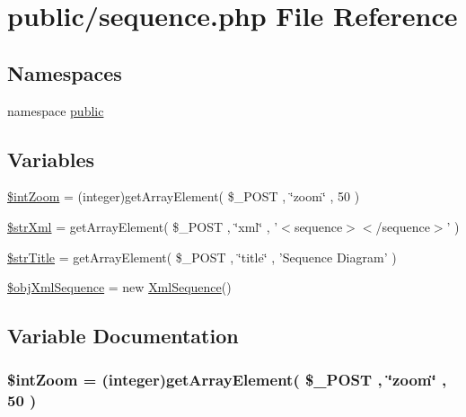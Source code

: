 \hypertarget{sequence_8php}{
\section{public/sequence.php File Reference}
\label{sequence_8php}
}
\subsection*{Namespaces}
\begin{CompactItemize}
\item 
namespace \hyperlink{namespacepublic}{public}
\end{CompactItemize}
\subsection*{Variables}
\begin{CompactItemize}
\item 
\hyperlink{sequence_8php_ba837fb08baf5fbca04d8237a589e93e}{\$intZoom} = (integer)getArrayElement( \$\_\-POST , \char`\"{}zoom\char`\"{} , 50 )
\item 
\hyperlink{sequence_8php_2651e3074f6303e4683f2aff16ec1fbd}{\$strXml} = getArrayElement( \$\_\-POST , \char`\"{}xml\char`\"{} , '$<$sequence$>$$<$/sequence$>$' )
\item 
\hyperlink{sequence_8php_e5059171a0a3647786809cd168a41c0f}{\$strTitle} = getArrayElement( \$\_\-POST , \char`\"{}title\char`\"{} , 'Sequence Diagram' )
\item 
\hyperlink{sequence_8php_eefa469c1b13fe1fec040c910b720034}{\$objXmlSequence} = new \hyperlink{class_xml_sequence}{XmlSequence}()
\end{CompactItemize}


\subsection{Variable Documentation}
\hypertarget{sequence_8php_ba837fb08baf5fbca04d8237a589e93e}{
\subsubsection[{\$intZoom}]{\setlength{\rightskip}{0pt plus 5cm}\$intZoom = (integer)getArrayElement( \$\_\-POST , \char`\"{}zoom\char`\"{} , 50 )}}
\label{sequence_8php_ba837fb08baf5fbca04d8237a589e93e}


